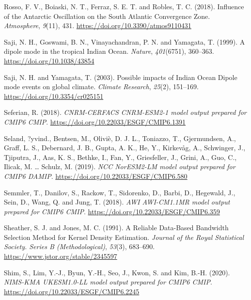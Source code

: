 \documentclass[12pt,oneside,a4paper]{reedthesis}
\newlength{\cslhangindent}
\newenvironment{CSLReferences}[2] %
 {%
  \setlength{\parindent}{0pt}
  \ifodd #1 \everypar{\setlength{\hangindent}{\cslhangindent}}\ignorespaces\fi
  \ifnum #2 > 0
  \setlength{\parskip}{#2\baselineskip}
  \fi
 }%
 {}
\begin{document}
\begin{CSLReferences}{1}{0}
\leavevmode{}%
Rosso, F. V., Boiaski, N. T., Ferraz, S. E. T. and Robles, T. C. (2018). Influence of the {Antarctic Oscillation} on the {South Atlantic Convergence Zone}. \emph{Atmosphere}, \emph{9}(11), 431. \url{https://doi.org/10.3390/atmos9110431}

\leavevmode{}%
Saji, N. H., Goswami, B. N., Vinayachandran, P. N. and Yamagata, T. (1999). A dipole mode in the tropical {Indian Ocean}. \emph{Nature}, \emph{401}(6751), 360--363. \url{https://doi.org/10.1038/43854}

\leavevmode{}%
Saji, N. H. and Yamagata, T. (2003). Possible impacts of {Indian Ocean Dipole} mode events on global climate. \emph{Climate Research}, \emph{25}(2), 151--169. \url{https://doi.org/10.3354/cr025151}

\leavevmode{}%
Seferian, R. (2018). \emph{CNRM-CERFACS CNRM-ESM2-1 model output prepared for CMIP6 CMIP}. \url{https://doi.org/10.22033/ESGF/CMIP6.1391}

\leavevmode{}%
Seland, ?yvind., Bentsen, M., Oliviè, D. J. L., Toniazzo, T., Gjermundsen, A., Graff, L. S., Debernard, J. B., Gupta, A. K., He, Y., Kirkevåg, A., Schwinger, J., Tjiputra, J., Aas, K. S., Bethke, I., Fan, Y., Griesfeller, J., Grini, A., Guo, C., Ilicak, M. \ldots{} Schulz, M. (2019). \emph{NCC NorESM2-LM model output prepared for CMIP6 DAMIP}. \url{https://doi.org/10.22033/ESGF/CMIP6.580}

\leavevmode{}%
Semmler, T., Danilov, S., Rackow, T., Sidorenko, D., Barbi, D., Hegewald, J., Sein, D., Wang, Q. and Jung, T. (2018). \emph{AWI AWI-CM1.1MR model output prepared for CMIP6 CMIP}. \url{https://doi.org/10.22033/ESGF/CMIP6.359}

\leavevmode{}%
Sheather, S. J. and Jones, M. C. (1991). A {Reliable Data-Based Bandwidth Selection Method} for {Kernel Density Estimation}. \emph{Journal of the Royal Statistical Society. Series B (Methodological)}, \emph{53}(3), 683--690. \url{https://www.jstor.org/stable/2345597}

\leavevmode{}%
Shim, S., Lim, Y.-J., Byun, Y.-H., Seo, J., Kwon, S. and Kim, B.-H. (2020). \emph{NIMS-KMA UKESM1.0-LL model output prepared for CMIP6 CMIP}. \url{https://doi.org/10.22033/ESGF/CMIP6.2245}


\end{CSLReferences}
\end{document}
